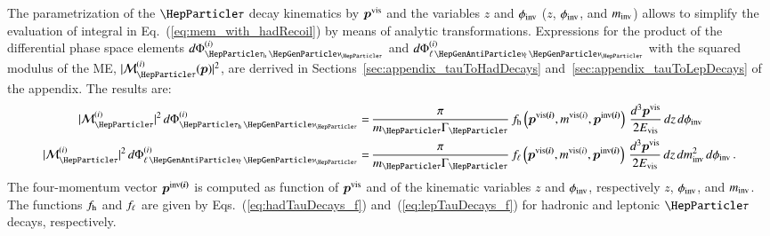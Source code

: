 %

The parametrization of the $\Pgt$ decay kinematics by $\bm{p}^{\textrm{vis}}$
and the variables $z$ and $\phi_{\textrm{inv}}$ ($z$, $\phi_{\textrm{inv}}$, and $m_{\textrm{inv}}$) 
allows to simplify the evaluation of integral in Eq.~(\ref{eq:mem_with_hadRecoil}) by means of analytic transformations.
Expressions for the product of the differential phase space elements
$d\Phi^{(i)}_{\tauhnu}$  and $d\Phi^{(i)}_{\ellnunu}$ with the squared
modulus of the ME, $\vert \mathcal{M}^{(i)}_{\Pgt}(\bm{p}) \vert^{2}$, are derrived in Sections~\ref{sec:appendix_tauToHadDecays} and~\ref{sec:appendix_tauToLepDecays} of the appendix.
The results are:
\begin{align}
\vert \mathcal{M}^{(i)}_{\Pgt} \vert^{2} \, d\Phi^{(i)}_{\tauhnu} 
 = & \, \frac{\pi}{m_{\Pgt}\Gamma_{\Pgt}} \,
 f_{\Phadron}\left(\bm{p^{\vis(i)}}, m^{\vis(i)},
   \bm{p^{\inv(i)}}\right) \, \frac{d^{3}\bm{p^{\vis}}}{2 E_{\vis}} \, dz \, d\phi_{\inv} \nonumber \\
\vert \mathcal{M}^{(i)}_{\Pgt} \vert^{2} \, d\Phi^{(i)}_{\ellnunu} 
 = & \, \frac{\pi}{m_{\Pgt}\Gamma_{\Pgt}} \, f_{\ell}\left(\bm{p^{\vis(i)}},
 m^{\vis(i)}, \bm{p^{\inv(i)}}\right) \, \frac{d^{3}\bm{p^{\vis}}}{2 E_{\vis}} \, dz \, dm^{2}_{\inv} \, d\phi_{\inv}
 \, .
\label{eq:PSint}
\end{align}
The four-momentum vector $\bm{p^{\textrm{inv}(i)}}$ is computed as function of
$\bm{p}^{\textrm{vis}}$ and of the kinematic variables $z$ and $\phi_{\textrm{inv}}$,
respectively $z$, $\phi_{\textrm{inv}}$, and $m_{\textrm{inv}}$.
The functions $f_{\textrm{h}}$ and $f_{\ell}$ are given by
Eqs.~(\ref{eq:hadTauDecays_f})
and~(\ref{eq:lepTauDecays_f})
for hadronic and leptonic $\Pgt$ decays, respectively.

